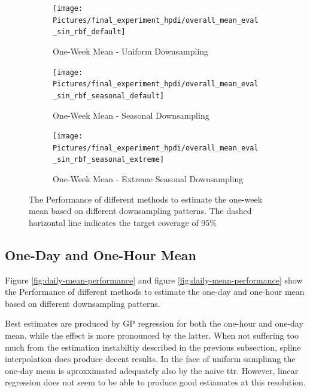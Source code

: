 \begin{figure}[!ht]
\centering
\begin{subfigure}{\textwidth}
    \centering
    \texttt{[image: Pictures/final\_experiment\_hpdi/overall\_mean\_eval\_sin\_rbf\_default]}
    \caption{One-Week Mean - Uniform Downsampling}
    \label{fig:weekly-mean-uniform-sampling-performance}
\end{subfigure}

\bigskip

\begin{subfigure}{\textwidth}
    \centering
    \texttt{[image: Pictures/final\_experiment\_hpdi/overall\_mean\_eval\_sin\_rbf\_seasonal\_default]}
    \caption{One-Week Mean - Seasonal Downsampling}
    \label{fig:weekly-mean-seasonal-sampling-performance}
\end{subfigure}

\bigskip

\begin{subfigure}{\textwidth}
    \centering
    \texttt{[image: Pictures/final\_experiment\_hpdi/overall\_mean\_eval\_sin\_rbf\_seasonal\_extreme]}
    \caption{One-Week Mean - Extreme Seasonal Downsampling}
    \label{fig:weekly-mean-extreme-seasonal-sampling-performance}
\end{subfigure}

\caption[One-Week Mean Performance]{The Performance of different methods to
estimate the one-week mean based on different downsampling patterns. The dashed horizontal line
indicates the target coverage of 95\% 
}
\label{fig:weekly-mean-performance}
\end{figure}



\subsection{One-Day and One-Hour Mean}

Figure \ref{fig:daily-mean-performance} and figure \ref{fig:daily-mean-performance}
show the Performance of different methods to
estimate the one-day and one-hour mean based on different downsampling patterns.

Best estimates are produced by GP regression for both the one-hour and one-day mean,
while the effect is more pronounced by the latter.
When not suffering too much from the estimation
instabiltiy described in the previous subsection,
spline interpolation does produce decent results.
In the face of uniform samplinng the one-day mean is aproxximated adequately also
by the naive ttr.
However, linear regression does not seem to be able to produce good estiamates
at this resolution.



